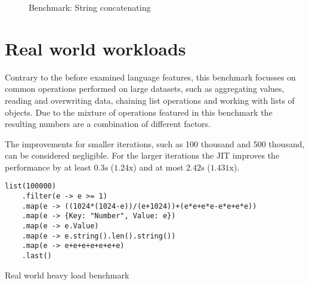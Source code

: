 \begin{figure}[H]
    \centering
    \caption{Benchmark: String concatenating}
    \label{chart:benchmark-string}
\end{figure}

\section{Real world workloads}

Contrary to the before examined language features, this benchmark focusses on
common operations performed on large datasets, such as aggregating values,
reading and overwriting data, chaining list operations and working with lists
of objects. Due to the mixture of operations featured in this benchmark the
resulting numbers are a combination of different factors.

The improvements for smaller iterations, such as 100 thousand and 500 thousand,
can be considered negligible. For the larger iterations the JIT improves the
performance by at least $0.3\textrm{s}$ ($1.24\textrm{x}$) and at most
$2.42\textrm{s}$ ($1.431\textrm{x}$).

\begin{listing}[H]
    \begin{verbatim}
list(100000)
    .filter(e -> e >= 1)
    .map(e -> ((1024*(1024-e))/(e+1024))+(e*e+e*e-e*e+e*e))
    .map(e -> {Key: "Number", Value: e})
    .map(e -> e.Value)
    .map(e -> e.string().len().string())
    .map(e -> e+e+e+e+e+e+e)
    .last()
    \end{verbatim}
    \caption{Real world heavy load benchmark}
    \label{code:benchmark-realworld}
\end{listing}

